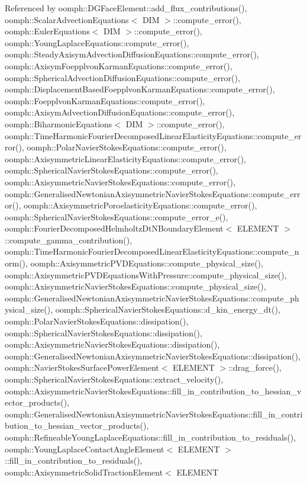 Referenced by oomph\+::\+D\+G\+Face\+Element\+::add\+\_\+flux\+\_\+contributions(), oomph\+::\+Scalar\+Advection\+Equations$<$ D\+I\+M $>$\+::compute\+\_\+error(), oomph\+::\+Euler\+Equations$<$ D\+I\+M $>$\+::compute\+\_\+error(), oomph\+::\+Young\+Laplace\+Equations\+::compute\+\_\+error(), oomph\+::\+Steady\+Axisym\+Advection\+Diffusion\+Equations\+::compute\+\_\+error(), oomph\+::\+Axisym\+Foepplvon\+Karman\+Equations\+::compute\+\_\+error(), oomph\+::\+Spherical\+Advection\+Diffusion\+Equations\+::compute\+\_\+error(), oomph\+::\+Displacement\+Based\+Foepplvon\+Karman\+Equations\+::compute\+\_\+error(), oomph\+::\+Foepplvon\+Karman\+Equations\+::compute\+\_\+error(), oomph\+::\+Axisym\+Advection\+Diffusion\+Equations\+::compute\+\_\+error(), oomph\+::\+Biharmonic\+Equations$<$ D\+I\+M $>$\+::compute\+\_\+error(), oomph\+::\+Time\+Harmonic\+Fourier\+Decomposed\+Linear\+Elasticity\+Equations\+::compute\+\_\+error(), oomph\+::\+Polar\+Navier\+Stokes\+Equations\+::compute\+\_\+error(), oomph\+::\+Axisymmetric\+Linear\+Elasticity\+Equations\+::compute\+\_\+error(), oomph\+::\+Spherical\+Navier\+Stokes\+Equations\+::compute\+\_\+error(), oomph\+::\+Axisymmetric\+Navier\+Stokes\+Equations\+::compute\+\_\+error(), oomph\+::\+Generalised\+Newtonian\+Axisymmetric\+Navier\+Stokes\+Equations\+::compute\+\_\+error(), oomph\+::\+Axisymmetric\+Poroelasticity\+Equations\+::compute\+\_\+error(), oomph\+::\+Spherical\+Navier\+Stokes\+Equations\+::compute\+\_\+error\+\_\+e(), oomph\+::\+Fourier\+Decomposed\+Helmholtz\+Dt\+N\+Boundary\+Element$<$ E\+L\+E\+M\+E\+N\+T $>$\+::compute\+\_\+gamma\+\_\+contribution(), oomph\+::\+Time\+Harmonic\+Fourier\+Decomposed\+Linear\+Elasticity\+Equations\+::compute\+\_\+norm(), oomph\+::\+Axisymmetric\+P\+V\+D\+Equations\+::compute\+\_\+physical\+\_\+size(), oomph\+::\+Axisymmetric\+P\+V\+D\+Equations\+With\+Pressure\+::compute\+\_\+physical\+\_\+size(), oomph\+::\+Axisymmetric\+Navier\+Stokes\+Equations\+::compute\+\_\+physical\+\_\+size(), oomph\+::\+Generalised\+Newtonian\+Axisymmetric\+Navier\+Stokes\+Equations\+::compute\+\_\+physical\+\_\+size(), oomph\+::\+Spherical\+Navier\+Stokes\+Equations\+::d\+\_\+kin\+\_\+energy\+\_\+dt(), oomph\+::\+Polar\+Navier\+Stokes\+Equations\+::dissipation(), oomph\+::\+Spherical\+Navier\+Stokes\+Equations\+::dissipation(), oomph\+::\+Axisymmetric\+Navier\+Stokes\+Equations\+::dissipation(), oomph\+::\+Generalised\+Newtonian\+Axisymmetric\+Navier\+Stokes\+Equations\+::dissipation(), oomph\+::\+Navier\+Stokes\+Surface\+Power\+Element$<$ E\+L\+E\+M\+E\+N\+T $>$\+::drag\+\_\+force(), oomph\+::\+Spherical\+Navier\+Stokes\+Equations\+::extract\+\_\+velocity(), oomph\+::\+Axisymmetric\+Navier\+Stokes\+Equations\+::fill\+\_\+in\+\_\+contribution\+\_\+to\+\_\+hessian\+\_\+vector\+\_\+products(), oomph\+::\+Generalised\+Newtonian\+Axisymmetric\+Navier\+Stokes\+Equations\+::fill\+\_\+in\+\_\+contribution\+\_\+to\+\_\+hessian\+\_\+vector\+\_\+products(), oomph\+::\+Refineable\+Young\+Laplace\+Equations\+::fill\+\_\+in\+\_\+contribution\+\_\+to\+\_\+residuals(), oomph\+::\+Young\+Laplace\+Contact\+Angle\+Element$<$ E\+L\+E\+M\+E\+N\+T $>$\+::fill\+\_\+in\+\_\+contribution\+\_\+to\+\_\+residuals(), oomph\+::\+Axisymmetric\+Solid\+Traction\+Element$<$ E\+L\+E\+M\+E\+N\+T 